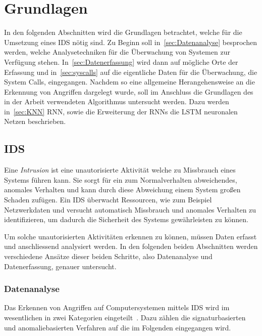 \chapter{Grundlagen}\label{ch:Grundlagen}
    In den folgenden Abschnitten wird die Grundlagen betrachtet, welche für die Umsetzung eines \ac{IDS} nötig sind.
    Zu Beginn soll in~\autoref{sec:Datenanalyse} besprochen werden, welche Analysetechniken für die Überwachung von Systemen zur Verfügung stehen.
    In~\autoref{sec:Datenerfassung} wird dann auf mögliche Orte der Erfassung und in~\autoref{sec:syscalls} auf die eigentliche Daten für die Überwachung, die System Calls, eingegangen.
    Nachdem so eine allgemeine Herangehensweise an die Erkennung von Angriffen dargelegt wurde, 
    soll im Anschluss die Grundlagen des in der Arbeit verwendeten Algorithmus untersucht werden.
    Dazu werden in~\autoref{sec:KNN} \ac{RNN}, sowie die Erweiterung der \ac{RNN}s die \ac{LSTM} neuronalen Netzen beschrieben.

    \section{\acl{IDS}}\label{sec:IDS}
        Eine \textit{Intrusion}  ist eine unautorisierte Aktivität welche zu Missbrauch eines Systems führen kann.
        Sie sorgt für ein zum Normalverhalten abweichendes, anomales Verhalten und kann durch diese Abweichung einem System großen Schaden zufügen.
        Ein \ac{IDS} überwacht Ressourcen, wie zum Beispiel Netzwerkdaten und versucht automatisch Missbrauch und anomales Verhalten zu identifizieren, um dadurch die Sicherheit des Systems gewährleisten zu können.~\cite{IDSPIETRO2008}

        Um solche unautorisierten Aktivitäten erkennen zu können, müssen Daten erfasst und anschliessend analysiert werden.
        In den folgenden beiden Abschnitten werden verschiedene Ansätze dieser beiden Schritte, also Datenanalyse und Datenerfassung, genauer untersucht.

        \subsection{Datenanalyse}\label{sec:Datenanalyse}
            Das Erkennen von Angriffen auf Computersystemen mittels \ac{IDS} wird im wesentlichen in zwei Kategorien eingeteilt~\cite{IDSreview, IDSsurvey, IDSsurvey2}.
            Dazu zählen die signaturbasierten und anomaliebasierten Verfahren auf die im Folgenden eingegangen wird.

